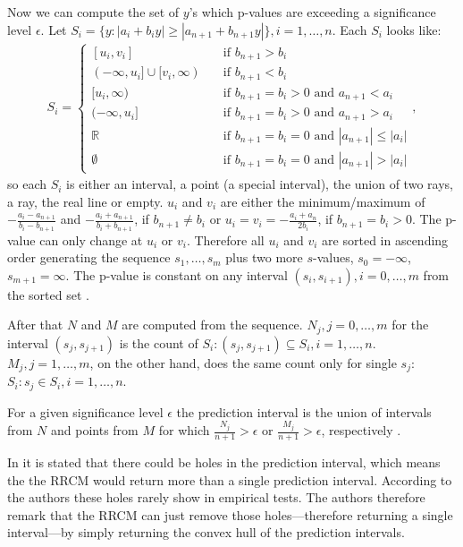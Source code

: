 \documentclass[twoside,11pt]{article}
\begin{document}
Now we can compute the set of $y$'s which p-values are
exceeding a significance level $\epsilon$.
Let $S_i = \{y: |a_i + b_i y| \geq |a_{n+1} + b_{n+1} y|\},
i=1,\dots,n$. Each $S_i$ looks like:
\begin{align*}
S_i =
  \begin{cases}
    [u_i,v_i]
      &\quad \text{if } b_{n+1} > b_i
      \\
    (-\infty, u_i] \cup [v_i, \infty)
      &\quad \text{if } b_{n+1} < b_i
      \\
    [u_i, \infty)
      &\quad \text{if } b_{n+1} = b_i > 0
      \text{ and } a_{n+1} < a_i
      \\
    (-\infty, u_i]
      &\quad \text{if } b_{n+1} = b_i > 0
      \text{ and } a_{n+1} > a_i
      \\
    \mathbb{R}
      &\quad \text{if } b_{n+1} = b_i = 0
      \text{ and } |a_{n+1}| \leq |a_i|
      \\
    \emptyset
      &\quad \text{if } b_{n+1} = b_i = 0
      \text{ and } |a_{n+1}| > |a_i|
  \end{cases},
\end{align*}
so each $S_i$ is either an interval, a point (a special
interval), the union of two rays, a ray, the real line or
empty.
$u_i$ and $v_i$ are either the minimum/maximum of
$-\frac{a_i - a_{n+1}}{b_i - b_{n+1}}$ and
$-\frac{a_i + a_{n+1}}{b_i + b_{n+1}}$,
if $b_{n+1} \neq b_{i}$ or
$u_i = v_i = -\frac{a_i + a_n}{2b_i}$, if
$b_{n+1} = b_i > 0$.
The p-value can only change at $u_i$ or $v_i$.
Therefore all $u_i$ and $v_i$ are sorted in ascending
order generating the sequence $s_1,\dots,s_m$ plus two more
$s$-values, $s_0=-\infty$, $s_{m+1}=\infty$.
The p-value is constant on any interval
$(s_i,s_{i+1}),i=0,\dots,m$ from the sorted set
\citep[see][]{nouretdinov_et_al_2001}.

After that $N$ and $M$ are computed from the sequence.
$N_j, j=0,\dots,m$ for the interval $(s_j,s_{j+1})$ is the
count of $S_i: (s_j,s_{j+1}) \subseteq S_i, i=1,\dots,n$.
$M_j, j=1,\dots,m$, on the other hand, does the same count
only for single $s_j$: $S_i: s_j \in S_i, i=1,\dots,n$.

For a given significance level $\epsilon$ the prediction
interval is the union of intervals from $N$ and points from
$M$ for which $\frac{N_j}{n+1} > \epsilon$ or
$\frac{M_j}{n+1} > \epsilon$, respectively
\citep[see][Chapter 2.3]{alrw}.

In \citet{nouretdinov_et_al_2001} it is stated that there
could be holes in the prediction interval, which means the
the RRCM would return more than a single prediction
interval.
According to the authors these holes rarely show in
empirical tests.
The authors therefore remark that the RRCM can just remove
those holes---therefore returning a single interval---by
simply returning the convex hull of the prediction
intervals.
\end{document}
